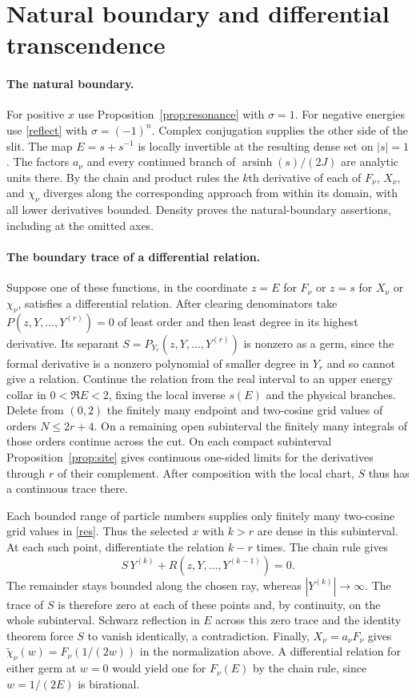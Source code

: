 \documentclass[11pt]{article}
\DeclareMathOperator{\arsinh}{arsinh}
\begin{document}
\section{Natural boundary and differential transcendence}

\paragraph{The natural boundary.}
For positive $x$ use Proposition~\ref{prop:resonance} with $\sigma=1$.
For negative energies use
\eqref{reflect} with $\sigma=(-1)^n$. Complex conjugation supplies
the other side of the slit. The map $E=s+s^{-1}$ is locally
invertible at the resulting dense set on $|s|=1$. The factors
$a_\nu$ and every continued branch of $\arsinh(s)/(2J)$ are analytic
units there. By the chain and product rules the $k$th derivative of
each of $F_\nu$, $X_\nu$, and $\chi_\nu$ diverges along the corresponding
approach from within its domain, with all lower derivatives bounded. Density proves the
natural-boundary assertions, including at the omitted axes.

\paragraph{The boundary trace of a differential relation.}
Suppose one of these functions, in the coordinate $z=E$ for $F_\nu$
or $z=s$ for $X_\nu$ or $\chi_\nu$, satisfies a differential
relation. After clearing denominators take $P(z,Y,\ldots,Y^{(r)})=0$
of least order and then least degree in its highest derivative.
Its separant $S=P_{Y_r}(z,Y,\ldots,Y^{(r)})$ is nonzero as a germ,
since the formal derivative is a nonzero polynomial of smaller degree
in $Y_r$ and so cannot give a relation. Continue the relation from the real interval to an
upper energy collar in $0<\Re E<2$, fixing the local inverse $s(E)$
and the physical branches. Delete
from $(0,2)$ the finitely many endpoint and two-cosine grid values
of orders $N\le2r+4$. On a remaining open subinterval the finitely
many integrals of those orders continue across the cut. On each compact
subinterval Proposition~\ref{prop:site} gives continuous one-sided
limits for the derivatives through $r$ of their complement. After
composition with the local chart, $S$ thus has a continuous trace there.

Each bounded range of particle numbers supplies only finitely many
two-cosine grid values in \eqref{res}. Thus the selected $x$ with
$k>r$ are dense in this subinterval. At each such point, differentiate the
relation $k-r$ times. The chain rule gives
\[
 S\,Y^{(k)}+R(z,Y,\ldots,Y^{(k-1)})=0 .
\]
The remainder stays bounded along the chosen ray, whereas
$|Y^{(k)}|\to\infty$. The trace of $S$ is therefore zero at each
of these points and, by continuity, on the whole subinterval.
Schwarz reflection in $E$ across this zero trace and
the identity theorem force $S$ to vanish identically, a contradiction.
Finally, $X_\nu=a_\nu F_\nu$ gives
$\widetilde\chi_\nu(w)=F_\nu(1/(2w))$ in the normalization above.
A differential relation for either germ at $w=0$ would yield one
for $F_\nu(E)$ by the chain rule, since $w=1/(2E)$ is birational.
\end{document}
